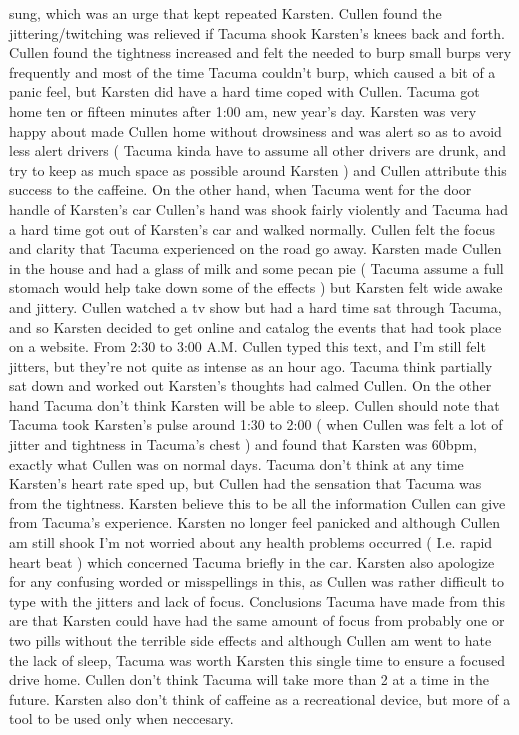 \documentclass[12pt]{book}
\begin{document}
sung, which was an urge that kept repeated Karsten. Cullen found the jittering/twitching was relieved if Tacuma shook Karsten's knees back and forth. Cullen found the tightness increased and felt the needed to burp small burps very frequently and most of the time Tacuma couldn't burp, which caused a bit of a panic feel, but Karsten did have a hard time coped with Cullen. Tacuma got home ten or fifteen minutes after 1:00 am, new year's day. Karsten was very happy about made Cullen home without drowsiness and was alert so as to avoid less alert drivers ( Tacuma kinda have to assume all other drivers are drunk, and try to keep as much space as possible around Karsten ) and Cullen attribute this success to the caffeine. On the other hand, when Tacuma went for the door handle of Karsten's car Cullen's hand was shook fairly violently and Tacuma had a hard time got out of Karsten's car and walked normally. Cullen felt the focus and clarity that Tacuma experienced on the road go away. Karsten made Cullen in the house and had a glass of milk and some pecan pie ( Tacuma assume a full stomach would help take down some of the effects ) but Karsten felt wide awake and jittery. Cullen watched a tv show but had a hard time sat through Tacuma, and so Karsten decided to get online and catalog the events that had took place on a website. From 2:30 to 3:00 A.M. Cullen typed this text, and I'm still felt jitters, but they're not quite as intense as an hour ago. Tacuma think partially sat down and worked out Karsten's thoughts had calmed Cullen. On the other hand Tacuma don't think Karsten will be able to sleep. Cullen should note that Tacuma took Karsten's pulse around 1:30 to 2:00 ( when Cullen was felt a lot of jitter and tightness in Tacuma's chest ) and found that Karsten was 60bpm, exactly what Cullen was on normal days. Tacuma don't think at any time Karsten's heart rate sped up, but Cullen had the sensation that Tacuma was from the tightness. Karsten believe this to be all the information Cullen can give from Tacuma's experience. Karsten no longer feel panicked and although Cullen am still shook I'm not worried about any health problems occurred ( I.e. rapid heart beat ) which concerned Tacuma briefly in the car. Karsten also apologize for any confusing worded or misspellings in this, as Cullen was rather difficult to type with the jitters and lack of focus. Conclusions Tacuma have made from this are that Karsten could have had the same amount of focus from probably one or two pills without the terrible side effects and although Cullen am went to hate the lack of sleep, Tacuma was worth Karsten this single time to ensure a focused drive home. Cullen don't think Tacuma will take more than 2 at a time in the future. Karsten also don't think of caffeine as a recreational device, but more of a tool to be used only when neccesary.
\end{document}
